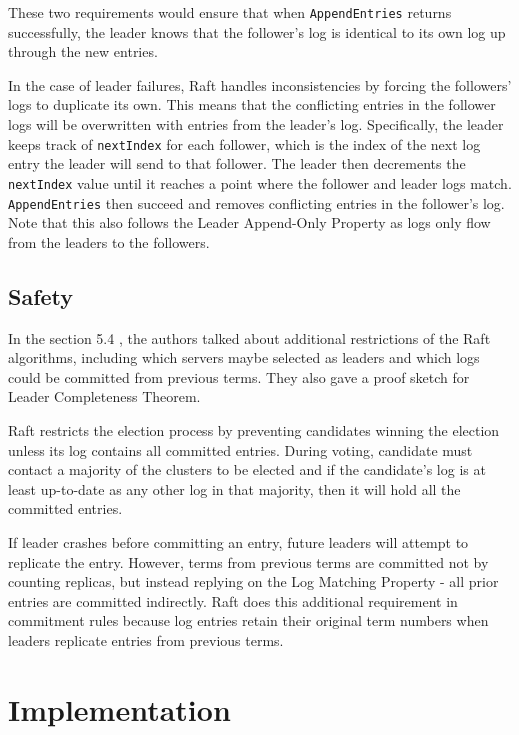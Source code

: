\documentclass[11pt]{article}
\begin{document}
These two requirements would ensure that when \texttt{AppendEntries} returns successfully, the leader knows that the follower’s log is identical to its own log up through the new entries. 

In the case of leader failures, Raft handles inconsistencies by forcing the followers’ logs to duplicate its own. This means that the conflicting entries in the follower logs will be overwritten with entries from the leader’s log. Specifically, the leader keeps track of \texttt{nextIndex} for each follower, which is the index of the next log entry the leader will send to that follower. The leader then decrements the \texttt{nextIndex} value until it reaches a point where the follower and leader logs match. \texttt{AppendEntries} then succeed and removes conflicting entries in the follower’s log. Note that this also follows the Leader Append-Only Property as logs only flow from the leaders to the followers. 
\subsection{Safety}
In the section 5.4 \cite{Raft}, the authors talked about additional restrictions of the Raft algorithms, including which servers maybe selected as leaders and which logs could be committed from previous terms. They also gave a proof sketch for Leader Completeness Theorem.

Raft restricts the election process by preventing candidates winning the election unless its log contains all committed entries. During voting, candidate must contact a majority of the clusters to be elected and if the candidate’s log is at least up-to-date as any other log in that majority, then it will hold all the committed entries. 

If leader crashes before committing an entry, future leaders will attempt to replicate the entry. However, terms from previous terms are committed not by counting replicas, but instead replying on the Log Matching Property - all prior entries are committed indirectly. Raft does this additional requirement in commitment rules because log entries retain their original term numbers when leaders replicate entries from previous terms. 

\section{Implementation}
\end{document}
